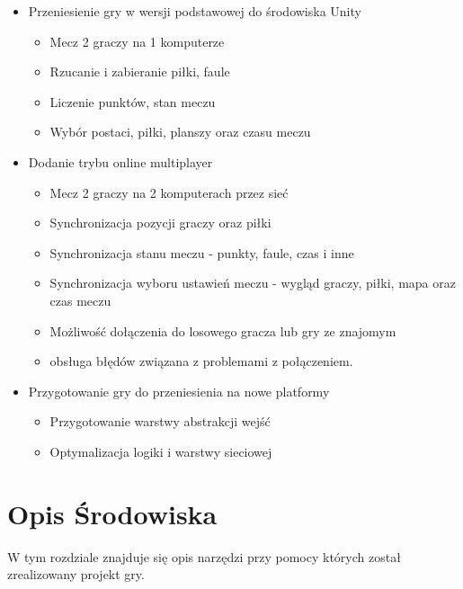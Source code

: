 \documentclass[a4paper,12pt,twoside,openany]{report}
\begin{document}
\begin{itemize}
    \item Przeniesienie gry w wersji podstawowej do środowiska Unity
    \begin{itemize}
        \item Mecz 2 graczy na 1 komputerze
        \item Rzucanie i zabieranie piłki, faule
        \item Liczenie punktów, stan meczu
        \item Wybór postaci, piłki, planszy oraz czasu meczu
    \end{itemize}
    
    \item Dodanie trybu online multiplayer
    \begin{itemize}
        \item Mecz 2 graczy na 2 komputerach przez sieć
        \item Synchronizacja pozycji graczy oraz piłki
        \item Synchronizacja stanu meczu - punkty, faule, czas i inne
        \item Synchronizacja wyboru ustawień meczu - wygląd graczy, piłki, mapa oraz czas meczu
        \item Możliwość dołączenia do losowego gracza lub gry ze znajomym
        \item obsługa błędów związana z problemami z połączeniem.
    \end{itemize}
    
    \item Przygotowanie gry do przeniesienia na nowe platformy
    \begin{itemize}
        \item Przygotowanie warstwy abstrakcji wejść
        \item Optymalizacja logiki i warstwy sieciowej
    \end{itemize}
\end{itemize}



\chapter{Opis Środowiska}
W tym rozdziale znajduje się opis narzędzi przy pomocy których został zrealizowany projekt gry.
\end{document}
